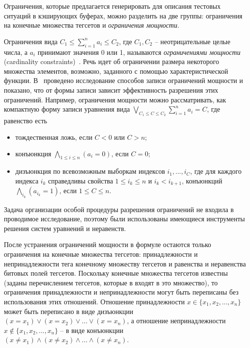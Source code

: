 Ограничения, которые предлагается генерировать для описания тестовых
ситуаций в кэширующих буферах, можно разделить на две группы:
ограничения на конечные множества тегсетов и \emph{ограничения
мощности}.

Ограничения вида $C_1 \leqslant \sum_{i=1}^n a_i \leqslant C_2$, где
$C_1, C_2$ -- неотрицательные целые числа, а $a_i$ принимают
значения 0 или 1, называются \emph{ограничениями мощности}
(cardinality constraints)~\cite{smt_debugging, PiskacK08, KuncakR07,
Revesz05}. Речь идет об ограничении размера некоторого множества
элементов, возможно, заданного с помощью характеристической функции.
В~\cite{smt_debugging} проведено исследование способов записи
ограничений мощности и показано, что от формы записи зависит
эффективность разрешения этих ограничений. Например, ограничения
мощности можно рассматривать, как компактную форму записи уравнения
вида $\bigvee_{C_1 \leqslant C \leqslant C_2} \sum_{i=1}^n a_i = C$,
где равенство есть
\begin{itemize}
\item тождественная ложь, если $C < 0$ или $C > n$;
\item конъюнкция $\bigwedge_{1\leqslant i\leqslant n} (a_i = 0)$,
если $C = 0$;
\item дизъюнкция по всевозможным выборкам индексов $i_1, ..., i_C$, где
для каждого индекса $i_k$ справедливы свойства $1 \leqslant i_k
\leqslant n$ и $i_k < i_{k+1}$, конъюнкций $\bigwedge_{i_k} (a_{i_k}
= 1)$, если $1 \leqslant C \leqslant n$.
\end{itemize}

Задача организации особой процедуры разрешения ограничений не
входила в проводимое исследование, поэтому были использованы
имеющиеся инструменты решения систем уравнений и неравенств.

После устранения ограничений мощности в формуле остаются только
ограничения на конечные множества тегсетов: принадлежности и
непринадлежности тега конечному множеству тегсетов и равенства и
неравенства битовых полей тегсетов. Поскольку конечные множества
тегсетов известны (заданы перечислением тегсетов, которые в входят в
это множество), то ограничения принадлежности и непринадлежности
могут быть переписаны без использования этих отношений. Отношение
принадлежности $x \in \{x_1, x_2, ..., x_n\}$ может быть переписано
в виде дизъюнкции $(x = x_1) \vee (x = x_2) \vee ... \vee (x =
x_n)$, а отношение непринадлежности $x \notin \{x_1, x_2, ...,
x_n\}$ -- в виде конъюнкции $(x \neq x_1) \wedge (x \neq x_2) \wedge
... \wedge (x \neq x_n)$.

